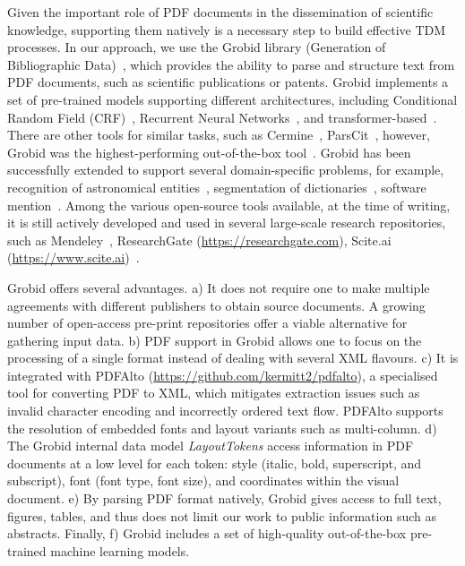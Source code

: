 Given the important role of PDF documents in the dissemination of scientific knowledge, supporting them natively is a necessary step to build effective TDM processes. 
In our approach, we use the Grobid library (Generation of Bibliographic Data)~\cite{Grobid}, which provides the ability to parse and structure text from PDF documents, such as scientific publications or patents. 
Grobid implements a set of pre-trained models supporting different architectures, including Conditional Random Field (CRF)~\cite{lafferty2001conditional}, Recurrent Neural Networks~\cite{lample2016neural}, and transformer-based~\cite{devlin2018bert}.
There are other tools for similar tasks, such as Cermine~\cite{tkaczyk2015cermine}, ParsCit~\cite{councill2008parscit}, however, Grobid was the highest-performing out-of-the-box tool~\cite{tkaczyk2018evaluation}.
Grobid has been successfully extended to support several domain-specific problems, for example, recognition of astronomical entities~\cite{grobid-astro}, segmentation of dictionaries~\cite{khemakhem2017automatic}, software mention~\cite{software-mentions}. 
Among the various open-source tools available, at the time of writing, it is still actively developed and used in several large-scale research repositories, such as Mendeley~\cite{mendeley-extraction}, ResearchGate (\url{https://researchgate.com}), Scite.ai (\url{https://www.scite.ai})~\cite{nicholson2021scite}. 

Grobid offers several advantages. 
a) It does not require one to make multiple agreements with different publishers to obtain source documents. A growing number of open-access pre-print repositories offer a viable alternative for gathering input data. 
b) PDF support in Grobid allows one to focus on the processing of a single format instead of dealing with several XML flavours. 
c) It is integrated with PDFAlto (\url{https://github.com/kermitt2/pdfalto}), a specialised tool for converting PDF to XML, which mitigates extraction issues such as invalid character encoding and incorrectly ordered text flow. PDFAlto supports the resolution of embedded fonts and layout variants such as multi-column. 
d) The Grobid internal data model \textit{LayoutTokens} access information in PDF documents at a low level for each token: style (italic, bold, superscript, and subscript), font (font type, font size), and coordinates within the visual document. 
e) By parsing PDF format natively, Grobid gives access to full text, figures, tables, and thus does not limit our work to public information such as abstracts.
Finally, f) Grobid includes a set of high-quality out-of-the-box pre-trained machine learning models.

